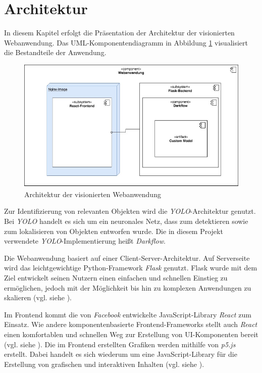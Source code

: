 \section{Architektur}

In diesem Kapitel erfolgt die Präsentation der Architektur der visionierten Webanwendung.
Das UML-Komponentendiagramm in Abbildung \ref{Architektur} visualisiert die Bestandteile der Anwendung.  

\begin{figure}[h!]
    \includegraphics[width=\linewidth]{resources/images/bigdata-prak-arch_recent.jpg}
    \caption{Architektur der visionierten Webanwendung}
    \label{Architektur}
\end{figure}

Zur Identifizierung von relevanten Objekten wird die \textit{YOLO}-Architektur genutzt.
Bei \textit{YOLO} handelt es sich um ein neuronales Netz, dass zum detektieren sowie zum lokalisieren von Objekten entworfen wurde.
Die in diesem Projekt verwendete \textit{YOLO}-Implementierung heißt \textit{Darkflow}. 

Die Webanwendung basiert auf einer Client-Server-Architektur.
Auf Serverseite wird das leichtgewichtige Python-Framework \textit{Flask} genutzt.
Flask wurde mit dem Ziel entwickelt seinen Nutzern einen einfachen und schnellen Einstieg zu ermöglichen, 
jedoch mit der Möglichkeit bis hin zu komplexen Anwendungen zu skalieren (vgl. siehe \cite{palletsprojects}). 

Im Frontend kommt die von \textit{Facebook} entwickelte JavaScript-Library \textit{React} zum Einsatz.
Wie andere komponentenbasierte Frontend-Frameworks stellt auch \textit{React} einen komfortablen und schnellen 
Weg zur Erstellung von UI-Komponenten bereit (vgl. siehe \cite{react.js}). 
Die im Frontend erstellten Grafiken werden mithilfe von \textit{p5.js} erstellt.
Dabei handelt es sich wiederum um eine JavaScript-Library für die Erstellung von grafischen und interaktiven
Inhalten (vgl. siehe \cite{p5.js}). 

